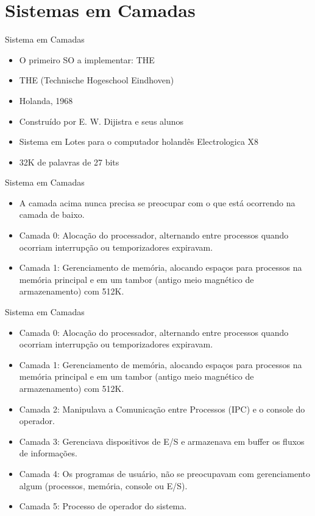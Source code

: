 \documentclass{beamer}
\begin{document}
\section{Sistemas em Camadas}
\begin{frame}{Sistema em Camadas}
    \begin{itemize}
        \item O primeiro SO a implementar: THE
        \item THE (Technische Hogeschool Eindhoven)
        \item Holanda, 1968
        \item Construído por E. W. Dijistra e seus alunos
        \item Sistema em Lotes para o computador holandês Electrologica X8
        \item 32K de palavras de 27 bits
    \end{itemize}
\end{frame}
\begin{frame}{Sistema em Camadas}
    \begin{itemize}
        \item A camada acima nunca precisa se preocupar com o que está ocorrendo na camada de baixo.
        \item Camada 0: Alocação do processador, alternando entre processos quando ocorriam interrupção ou temporizadores expiravam.
        \item Camada 1: Gerenciamento de memória, alocando espaços para processos na memória principal e em um tambor (antigo meio magnético de armazenamento) com 512K.
    \end{itemize}
\end{frame}
\begin{frame}{Sistema em Camadas}
    \begin{itemize}
        \item Camada 0: Alocação do processador, alternando entre processos quando ocorriam interrupção ou temporizadores expiravam.
        \item Camada 1: Gerenciamento de memória, alocando espaços para processos na memória principal e em um tambor (antigo meio magnético de armazenamento) com 512K.
        \item Camada 2: Manipulava a Comunicação entre Processos (IPC) e o console do operador.
        \item Camada 3: Gerenciava dispositivos de E/S e armazenava em buffer os fluxos de informações.
        \item Camada 4: Os programas de usuário, não se preocupavam com gerenciamento algum (processos, memória, console ou E/S).
        \item Camada 5: Processo de operador do sistema.
    \end{itemize}
\end{frame}
\end{document}
